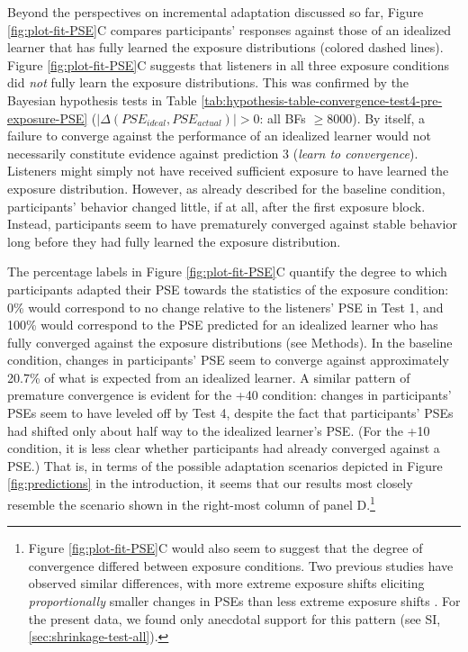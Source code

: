 \documentclass[
  11pt,
  man,mask,floatsintext]{apa6}
\begin{document}
Beyond the perspectives on incremental adaptation discussed so far, Figure \ref{fig:plot-fit-PSE}C compares participants' responses against those of an idealized learner that has fully learned the exposure distributions (colored dashed lines). Figure \ref{fig:plot-fit-PSE}C suggests that listeners in all three exposure conditions did \emph{not} fully learn the exposure distributions. This was confirmed by the Bayesian hypothesis tests in Table \ref{tab:hypothesis-table-convergence-test4-pre-exposure-PSE} (\(|\Delta(PSE_{ideal}, PSE_{actual})| > 0\): all BFs \(\ge 8000\)). By itself, a failure to converge against the performance of an idealized learner would not necessarily constitute evidence against prediction 3 (\emph{learn to convergence}). Listeners might simply not have received sufficient exposure to have learned the exposure distribution. However, as already described for the baseline condition, participants' behavior changed little, if at all, after the first exposure block. Instead, participants seem to have prematurely converged against stable behavior long before they had fully learned the exposure distribution.

The percentage labels in Figure \ref{fig:plot-fit-PSE}C quantify the degree to which participants adapted their PSE towards the statistics of the exposure condition: 0\% would correspond to no change relative to the listeners' PSE in Test 1, and 100\% would correspond to the PSE predicted for an idealized learner who has fully converged against the exposure distributions (see Methods). In the baseline condition, changes in participants' PSE seem to converge against approximately 20.7\% of what is expected from an idealized learner. A similar pattern of premature convergence is evident for the +40 condition: changes in participants' PSEs seem to have leveled off by Test 4, despite the fact that participants' PSEs had shifted only about half way to the idealized learner's PSE. (For the +10 condition, it is less clear whether participants had already converged against a PSE.) That is, in terms of the possible adaptation scenarios depicted in Figure \ref{fig:predictions} in the introduction, it seems that our results most closely resemble the scenario shown in the right-most column of panel D.\footnote{Figure \ref{fig:plot-fit-PSE}C would also seem to suggest that the degree of convergence differed between exposure conditions. Two previous studies have observed similar differences, with more extreme exposure shifts eliciting \emph{proportionally} smaller changes in PSEs than less extreme exposure shifts \autocite{kleinschmidt-jaeger2016,kleinschmidt2020}. For the present data, we found only anecdotal support for this pattern (see SI, \ref{sec:shrinkage-test-all}).}
\end{document}
